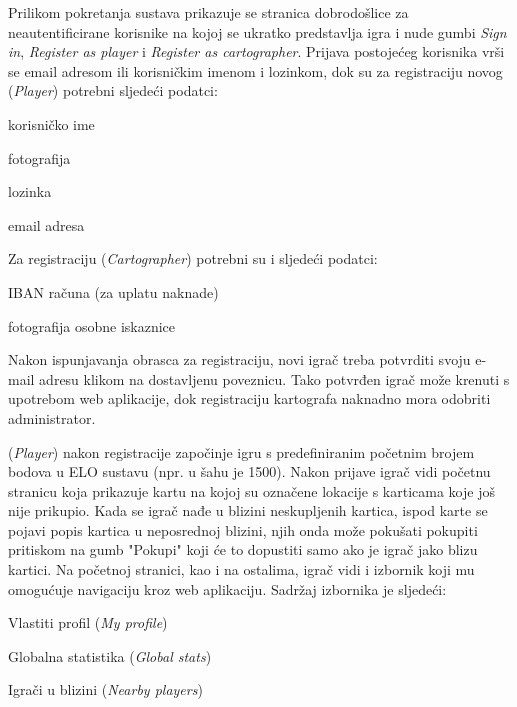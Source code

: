 		
		Prilikom pokretanja sustava prikazuje se stranica dobrodošlice za neautentificirane korisnike na kojoj se ukratko predstavlja igra i nude gumbi \textit{Sign in}, \textit{Register as player} i \textit{Register as cartographer}.  Prijava postojećeg korisnika vrši se email adresom ili korisničkim imenom i lozinkom, dok su za registraciju novog  (\textit{Player}) potrebni sljedeći podatci:
		\begin{packed_item}
		    \item korisničko ime
		    \item fotografija
		    \item lozinka
		    \item email adresa
		\end{packed_item}
		
		Za registraciju  (\textit{Cartographer}) potrebni su i sljedeći podatci:
		\begin{packed_item}
		    \item IBAN računa (za uplatu naknade)
		    \item fotografija osobne iskaznice
		\end{packed_item}
		
		Nakon ispunjavanja obrasca za registraciju, novi igrač treba potvrditi svoju e-mail adresu klikom na dostavljenu poveznicu. Tako potvrđen igrač može krenuti s upotrebom web aplikacije, dok registraciju kartografa naknadno mora odobriti administrator.
		
		 (\textit{Player}) nakon registracije započinje igru s predefiniranim početnim brojem bodova u ELO sustavu (npr. u šahu je 1500). Nakon prijave igrač vidi početnu stranicu koja prikazuje kartu na kojoj su označene lokacije s karticama koje još nije prikupio. Kada se igrač nađe u blizini neskupljenih kartica, ispod karte se pojavi popis kartica u neposrednoj blizini, njih onda može pokušati pokupiti pritiskom na gumb "Pokupi" koji će to dopustiti samo ako je igrač jako blizu kartici. Na početnoj stranici, kao i na ostalima, igrač vidi i izbornik koji mu omogućuje navigaciju kroz web aplikaciju. Sadržaj izbornika je sljedeći:
		
		\begin{packed_item}
		    \item Vlastiti profil (\textit{My profile})
		    \item Globalna statistika (\textit{Global stats})
		    \item Igrači u blizini (\textit{Nearby players})
		\end{packed_item}
		
